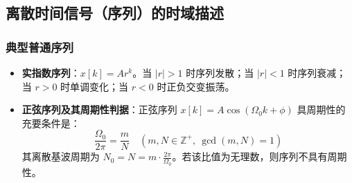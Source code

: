 \documentclass[11pt,a4paper,fontset=fandol]{ctexart}
\theoremstyle{remark}
\begin{document}
\subsection{离散时间信号（序列）的时域描述}

\subsubsection{典型普通序列}
\begin{itemize}
    \item \textbf{实指数序列}：$x[k] = A r^k$。当 $|r| > 1$ 时序列发散；当 $|r| < 1$ 时序列衰减；当 $r > 0$ 时单调变化；当 $r < 0$ 时正负交变振荡。
    \item \textbf{正弦序列及其周期性判据}：正弦序列 $x[k] = A\cos(\Omega_0 k + \phi)$ 具周期性的充要条件是：
    \begin{equation}
        \frac{\Omega_0}{2\pi} = \frac{m}{N} \quad (m, N \in \mathbb{Z}^+, \ \gcd(m, N) = 1)
    \end{equation}
    其离散基波周期为 $N_0 = N = m \cdot \frac{2\pi}{\Omega_0}$。若该比值为无理数，则序列不具有周期性。
\end{itemize}
\end{document}
